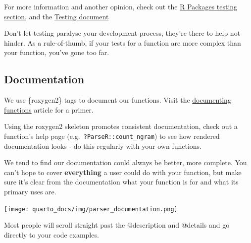 \documentclass[
  letterpaper,
  DIV=11,
  numbers=noendperiod]{scrreprt}
\begin{document}
For more information and another opinion, check out the
\href{https://r-pkgs.org/testing-basics.html}{R Packages testing
section}, and the \href{testing.qmd}{Testing document}

\begin{tcolorbox}[enhanced jigsaw, opacitybacktitle=0.6, breakable, title=\textcolor{quarto-callout-tip-color}{\faLightbulb}\hspace{0.5em}{Tip}, arc=.35mm, colframe=quarto-callout-tip-color-frame, colbacktitle=quarto-callout-tip-color!10!white, left=2mm, bottomrule=.15mm, opacityback=0, toprule=.15mm, bottomtitle=1mm, toptitle=1mm, titlerule=0mm, leftrule=.75mm, colback=white, rightrule=.15mm, coltitle=black]

Don't let testing paralyse your development process, they're there to
help not hinder. As a rule-of-thumb, if your tests for a function are
more complex than your function, you've gone too far.

\end{tcolorbox}

\subsection{Documentation}\label{documentation}

We use \{roxygen2\} tags to document our functions. Visit the
\href{https://roxygen2.r-lib.org/articles/rd.html}{documenting
functions} article for a primer.

Using the roxygen2 skeleton promotes consistent documentation, check out
a function's help page (e.g.~\texttt{?ParseR::count\_ngram}) to see how
rendered documentation looks - do this regularly with your own
functions.

We tend to find our documentation could always be better, more complete.
You can't hope to cover \textbf{everything} a user could do with your
function, but make sure it's clear from the documentation what your
function is for and what its primary uses are.

\texttt{[image: quarto\_docs/img/parser\_documentation.png]}

\begin{tcolorbox}[enhanced jigsaw, opacitybacktitle=0.6, breakable, title=\textcolor{quarto-callout-warning-color}{\faExclamationTriangle}\hspace{0.5em}{Warning}, arc=.35mm, colframe=quarto-callout-warning-color-frame, colbacktitle=quarto-callout-warning-color!10!white, left=2mm, bottomrule=.15mm, opacityback=0, toprule=.15mm, bottomtitle=1mm, toptitle=1mm, titlerule=0mm, leftrule=.75mm, colback=white, rightrule=.15mm, coltitle=black]

Most people will scroll straight past the @description and @details and
go directly to your code examples.

\end{tcolorbox}
\end{document}
